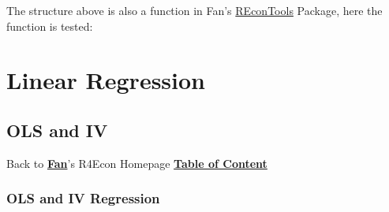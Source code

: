 \documentclass[
]{book}
\newenvironment{Shaded}{\begin{snugshade}}{\end{snugshade}}
\newcommand{\CommentTok}[1]{\textcolor[rgb]{0.56,0.35,0.01}{\textit{#1}}}
\newcommand{\KeywordTok}[1]{\textcolor[rgb]{0.13,0.29,0.53}{\textbf{#1}}}
\newcommand{\NormalTok}[1]{#1}
\newcommand{\OperatorTok}[1]{\textcolor[rgb]{0.81,0.36,0.00}{\textbf{#1}}}
\newcommand{\StringTok}[1]{\textcolor[rgb]{0.31,0.60,0.02}{#1}}
\begin{document}
The structure above is also a function in Fan's \href{https://fanwangecon.github.io/REconTools/}{REconTools} Package, here the function is tested:

\begin{Shaded}
\end{Shaded}

\hypertarget{linear-regression}{%
\chapter{Linear Regression}\label{linear-regression}}

\hypertarget{ols-and-iv}{%
\section{OLS and IV}\label{ols-and-iv}}

Back to \textbf{\href{https://fanwangecon.github.io/}{Fan}}'s R4Econ Homepage \textbf{\href{https://fanwangecon.github.io/R4Econ/}{Table of Content}}

\hypertarget{ols-and-iv-regression}{%
\subsection{OLS and IV Regression}\label{ols-and-iv-regression}}
\end{document}
